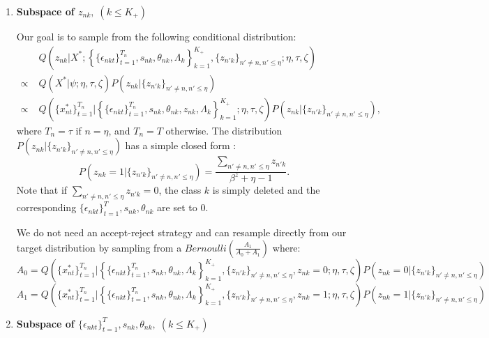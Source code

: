 \documentclass[12pt]{article}
\begin{document}
\begin{enumerate}
	\item \textbf{Subspace of $z_{nk}, \;(k \leq K_+)$ }
	
	Our goal is to sample from the following conditional distribution: 
	\begin{align*}
		&\; Q \left( z_{nk} | X^*; \left\{ \{\epsilon_{nkt}\}_{t=1}^{T_n}, s_{nk}, \theta_{nk}, \Lambda_{k} \right\}_{k=1}^{K_+},\{z_{n'k}\}_{n' \neq n, n'\leq\eta};\eta,\tau,\zeta \right) \\
		\propto & \; Q(X^*|\psi;\eta,\tau,\zeta) 	P\left(z_{nk}|\{z_{n'k}\}_{n' \neq n, n'\leq\eta}\right) \\
		\propto  &\; Q \left( \{x_{nt}^*\}_{t=1}^{T_n} | \left\{ \{\epsilon_{nkt}\}_{t=1}^{T_n}, s_{nk}, \theta_{nk}, z_{nk}, \Lambda_{k} \right\}_{k=1}^{K_+};
		 \eta,\tau,\zeta \right) 
		P\left(z_{nk}|\{z_{n'k}\}_{n' \neq n, n'\leq\eta}\right),
	\end{align*}
	where  $T_n=\tau$ if $n=\eta$, and $T_n=T$ otherwise. The distribution 	$	P\left(z_{nk}|\{z_{n'k}\}_{n' \neq n, n'\leq\eta}\right)$ has a simple closed form \citep{griffiths2011indian}:
	$$ 	P\left(z_{nk} = 1 |\{z_{n'k}\}_{n' \neq n, n'\leq\eta}\right) = \frac{\sum_{n' \neq n, n'\leq\eta} z_{n'k}}{\beta^z+\eta-1}.$$
	Note that if $\sum_{n' \neq n, n'\leq\eta} z_{n'k}=0$, the class $k$ is simply deleted and the corresponding $\{\epsilon_{nkt}\}_{t=1}^T, s_{nk}, \theta_{nk}$ are set to $0$.
	
	We do not need an accept-reject strategy and can resample directly from our target distribution by sampling from a $Bernoulli(\frac{A_1}{A_0+A_1})$ where:
	$$ A_0 = Q \left( \{x_{nt}^*\}_{t=1}^{T_n} | \left\{ \{\epsilon_{nkt}\}_{t=1}^{T_n}, s_{nk}, \theta_{nk}, \Lambda_{k} \right\}_{k=1}^{K_+},\{z_{n'k}\}_{n' \neq n, n'\leq\eta},z_{nk}=0;
	\eta,\tau,\zeta \right) 
	P\left(z_{nk}=0|\{z_{n'k}\}_{n' \neq n, n'\leq\eta}\right)  $$
	$$ A_1 = Q \left( \{x_{nt}^*\}_{t=1}^{T_n} | \left\{ \{\epsilon_{nkt}\}_{t=1}^{T_n}, s_{nk}, \theta_{nk}, \Lambda_{k} \right\}_{k=1}^{K_+},\{z_{n'k}\}_{n' \neq n, n'\leq\eta},z_{nk}=1;
	\eta,\tau,\zeta \right) 
	P\left(z_{nk}=1|\{z_{n'k}\}_{n' \neq n, n'\leq\eta}\right)  $$
	 
	
	\item \textbf{ Subspace of 	$\{\epsilon_{nkt}\}_{t=1}^T, s_{nk}, \theta_{nk}, \;(k \leq K_+)$}
	

\end{enumerate}
\end{document}
